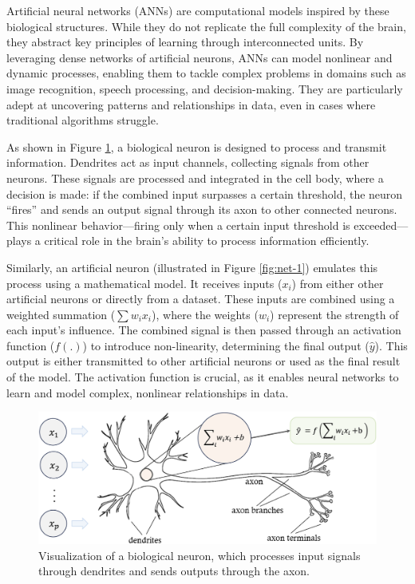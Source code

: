 \documentclass[
]{book}
\theoremstyle{definition}
\theoremstyle{definition}
\theoremstyle{definition}
\theoremstyle{definition}
\theoremstyle{remark}
\begin{document}
Artificial neural networks (ANNs) are computational models inspired by these biological structures. While they do not replicate the full complexity of the brain, they abstract key principles of learning through interconnected units. By leveraging dense networks of artificial neurons, ANNs can model nonlinear and dynamic processes, enabling them to tackle complex problems in domains such as image recognition, speech processing, and decision-making. They are particularly adept at uncovering patterns and relationships in data, even in cases where traditional algorithms struggle.

As shown in Figure \ref{fig:net-brain}, a biological neuron is designed to process and transmit information. Dendrites act as input channels, collecting signals from other neurons. These signals are processed and integrated in the cell body, where a decision is made: if the combined input surpasses a certain threshold, the neuron ``fires'' and sends an output signal through its axon to other connected neurons. This nonlinear behavior---firing only when a certain input threshold is exceeded---plays a critical role in the brain's ability to process information efficiently.

Similarly, an artificial neuron (illustrated in Figure \ref{fig:net-1}) emulates this process using a mathematical model. It receives inputs (\(x_i\)) from either other artificial neurons or directly from a dataset. These inputs are combined using a weighted summation (\(\sum w_i x_i\)), where the weights (\(w_i\)) represent the strength of each input's influence. The combined signal is then passed through an activation function (\(f(.)\)) to introduce non-linearity, determining the final output (\(\hat{y}\)). This output is either transmitted to other artificial neurons or used as the final result of the model. The activation function is crucial, as it enables neural networks to learn and model complex, nonlinear relationships in data.

\begin{figure}

{\centering \includegraphics[width=0.75\linewidth]{images/ch12_net_brain} 

}

\caption{Visualization of a biological neuron, which processes input signals through dendrites and sends outputs through the axon.}\label{fig:net-brain}
\end{figure}
\end{document}
